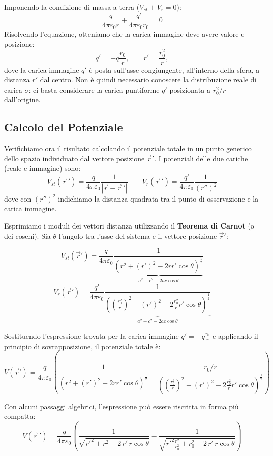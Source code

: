 \documentclass{book}
\begin{document}
Imponendo la condizione di massa a terra ($V_{st} + V_{r} = 0$):
$$
\frac{q}{4\pi\varepsilon_0 r} + \frac{q'}{4\pi\varepsilon_0 r_0}  = 0 
$$
Risolvendo l'equazione, otteniamo che la carica immagine deve avere valore e posizione:
\[
q'=-q\frac{r_0}{r},\qquad r'=\frac{r_0^2}{r},
\]
dove la carica immagine $q'$ è posta sull'asse congiungente, all'interno della sfera, a distanza $r'$ dal centro. 
Non è quindi necessario conoscere la distribuzione reale di carica $\sigma$: ci basta considerare la carica puntiforme $q'$ posizionata a $r_0^2/r$ dall'origine.

\subsection*{Calcolo del Potenziale}

Verifichiamo ora il risultato calcolando il potenziale totale in un punto generico dello spazio individuato dal vettore posizione $\vec{r}'$.
I potenziali delle due cariche (reale e immagine) sono:
$$
V_{st}(\vec{r}\,') = \frac{q}{4\pi \varepsilon_0}\frac{1}{|\vec{r}-\vec{r}\,'|} \qquad V_r (\vec{r}\,')= \frac{q'}{4 \pi \varepsilon_0 } \frac{1}{(r'')^2}
$$
dove con $(r'')^2$ indichiamo la distanza quadrata tra il punto di osservazione e la carica immagine.

Esprimiamo i moduli dei vettori distanza utilizzando il \textbf{Teorema di Carnot} (o dei coseni). Sia $\theta$ l'angolo tra l'asse del sistema e il vettore posizione $\vec{r}'$:

$$
V_{st}(\vec{r}')= \frac{q}{4 \pi \varepsilon_0 } \underbrace {\frac{1}{\left( r^2 + (r')^2 - 2rr'\cos{\theta} \right)^{\frac{1}{2}}}}_{a^2+c^2-2ac\cos{\theta}}
$$
$$
V_{r}(\vec{r}')= \frac{q'}{4 \pi \varepsilon_0 } \underbrace {\frac{1}{\left( \left(\frac{r_0^2}{r} \right)^2 + (r')^2 - 2\frac{r_0^2}{r}r'\cos{\theta} \right)^{\frac{1}{2}}}}_{a^2+c^2-2ac\cos{\theta}}
$$

Sostituendo l'espressione trovata per la carica immagine $q' = -q \frac{r_0}{r}$ e applicando il principio di sovrapposizione, il potenziale totale è:
\[
V(\vec{r}')= \frac{q}{4 \pi \varepsilon_0 } \left( \frac{1}{\left( r^2 + (r')^2 - 2rr'\cos{\theta} \right)^{\frac{1}{2}}} 
- \frac{r_0 / r}{\left( \left(\frac{r_0^2}{r} \right)^2 + (r')^2 - 2\frac{r_0^2}{r}r'\cos{\theta} \right)^{\frac{1}{2}}}
\right)
\]

Con alcuni passaggi algebrici, l'espressione può essere riscritta in forma più compatta:
\[
V(\vec{r}\,') =
\frac{q}{4\pi\varepsilon_0}
\left(
\frac{1}{\sqrt{r'^{2} + r^{2} - 2\,r'\,r\cos\theta}}
-
\frac{1}{\sqrt{r'^{2}\frac{r^{2}}{r_0^{2}} + r_{0}^{2} - 2\,r'\,r\cos\theta}}
\right)
\]
\end{document}
